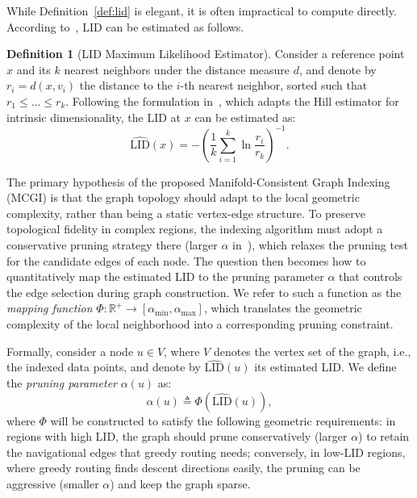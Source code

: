 \documentclass{article}
\theoremstyle{plain}
\theoremstyle{definition}
\newtheorem{definition}[theorem]{Definition}
\theoremstyle{remark}
\begin{document}
While Definition~\ref{def:lid} is elegant, it is often impractical to compute directly. According to~\cite{10.1145/2783258.2783405}, LID can be estimated as follows.

\begin{definition}[LID Maximum Likelihood Estimator]
\label{def:lid_mle}
Consider a reference point $x$ and its $k$ nearest neighbors under the distance measure $d$, and denote by $r_i = d(x, v_i)$ the distance to the $i$-th nearest neighbor, sorted such that $r_1 \le \dots \le r_k$. 
Following the formulation in~\cite{10.1145/2783258.2783405}, which adapts the Hill estimator for intrinsic dimensionality, the LID at $x$ can be estimated as:
\begin{equation}
    \widehat{\text{LID}}(x) = - \left( \frac{1}{k} \sum_{i=1}^{k} \ln \frac{r_i}{r_k} \right)^{-1}.
\end{equation}
\end{definition}

The primary hypothesis of the proposed Manifold-Consistent Graph Indexing (MCGI) is that the graph topology should adapt to the local geometric complexity, rather than being a static vertex-edge structure. 
To preserve topological fidelity in complex regions, the indexing algorithm must adopt a conservative pruning strategy there (larger $\alpha$ in~\cite{subramanya2019diskann}), which relaxes the pruning test for the candidate edges of each node.
The question then becomes how to quantitatively map the estimated LID to the pruning parameter $\alpha$ that controls the edge selection during graph construction.
We refer to such a function as the \textit{mapping function} $\Phi: \mathbb{R}^+ \to [\alpha_{\min}, \alpha_{\max}]$, which translates the geometric complexity of the local neighborhood into a corresponding pruning constraint.

Formally, consider a node $u \in V$, where $V$ denotes the vertex set of the graph, i.e., the indexed data points, and denote by $\widehat{\text{LID}}(u)$ its estimated LID. We define the \emph{pruning parameter} $\alpha(u)$ as:
\begin{equation}
    \alpha(u) \triangleq \Phi( \widehat{\text{LID}}(u) ),
\end{equation}
where $\Phi$ will be constructed to satisfy the following geometric requirements: in regions with high LID, the graph should prune conservatively (larger $\alpha$) to retain the navigational edges that greedy routing needs; conversely, in low-LID regions, where greedy routing finds descent directions easily, the pruning can be aggressive (smaller $\alpha$) and keep the graph sparse.
\end{document}
